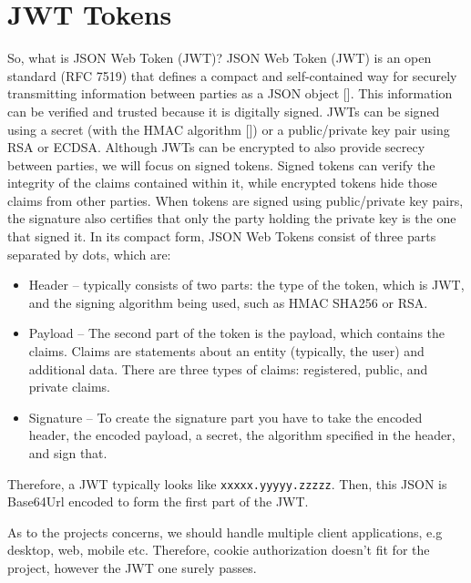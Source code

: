\section{JWT Tokens}\label{sec:jwt-tokens}
So, what is JSON Web Token (JWT)?
JSON Web Token (JWT) is an open standard (RFC 7519) that defines a compact and self-contained way for securely
transmitting information between parties as a JSON object [\cite{jones2015json}].
This information can be verified and trusted because it is digitally signed.
JWTs can be signed using a secret (with the HMAC algorithm [\cite{wang2004hmac}]) or a public/private key pair using RSA or ECDSA\@.
Although JWTs can be encrypted to also provide secrecy between parties, we will focus on signed tokens.
Signed tokens can verify the integrity of the claims contained within it, while encrypted tokens hide those claims from
other parties.
When tokens are signed using public/private key pairs, the signature also certifies that only the party holding the
private key is the one that signed it.
In its compact form, JSON Web Tokens consist of three parts separated by dots, which are:
\begin{itemize}
    \item Header -- typically consists of two parts: the type of the token, which is JWT, and the signing algorithm
    being used, such as HMAC SHA256 or RSA\@.
    \item Payload -- The second part of the token is the payload, which contains the claims.
    Claims are statements about an entity (typically, the user) and additional data.
    There are three types of claims: registered, public, and private claims.
    \item Signature -- To create the signature part you have to take the encoded header, the encoded payload, a secret,
    the algorithm specified in the header, and sign that.
\end{itemize}
Therefore, a JWT typically looks like \texttt{xxxxx.yyyyy.zzzzz}.
Then, this JSON is Base64Url encoded to form the first part of the JWT\@.

As to the projects concerns, we should handle multiple client applications, e.g desktop,
web, mobile etc.
Therefore, cookie authorization doesn't fit for the project, however the JWT one surely passes.


